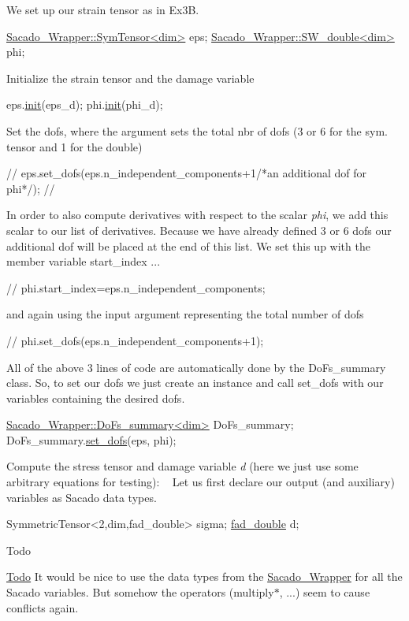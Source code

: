 We set up our strain tensor as in Ex3B. 
\begin{DoxyCode}
\hyperlink{classSacado__Wrapper_1_1SymTensor}{Sacado\_Wrapper::SymTensor<dim>} eps;
\hyperlink{classSacado__Wrapper_1_1SW__double}{Sacado\_Wrapper::SW\_double<dim>} phi;
\end{DoxyCode}
 Initialize the strain tensor and the damage variable 
\begin{DoxyCode}
eps.\hyperlink{classSacado__Wrapper_1_1SymTensor_acbad579d5ead9e96ff46aa15d9b5aef4}{init}(eps\_d);
phi.\hyperlink{classSacado__Wrapper_1_1SW__double_adca799dd92dadebda9aebc91c797682a}{init}(phi\_d);
\end{DoxyCode}
 Set the dofs, where the argument sets the total nbr of dofs (3 or 6 for the sym. tensor and 1 for the double) 
\begin{DoxyCode}
\textcolor{comment}{//    eps.set\_dofs(eps.n\_independent\_components+1/*an additional dof for phi*/);}
\textcolor{comment}{//}
\end{DoxyCode}
 In order to also compute derivatives with respect to the scalar {\itshape phi}, we add this scalar to our list of derivatives. Because we have already defined 3 or 6 dofs our additional dof will be placed at the end of this list. We set this up with the member variable start\+\_\+index ... 
\begin{DoxyCode}
\textcolor{comment}{//    phi.start\_index=eps.n\_independent\_components;}
\end{DoxyCode}
 and again using the input argument representing the total number of dofs 
\begin{DoxyCode}
\textcolor{comment}{//    phi.set\_dofs(eps.n\_independent\_components+1);}
\end{DoxyCode}
 All of the above 3 lines of code are automatically done by the Do\+Fs\+\_\+summary class. So, to set our dofs we just create an instance and call set\+\_\+dofs with our variables containing the desired dofs. 
\begin{DoxyCode}
\hyperlink{classSacado__Wrapper_1_1DoFs__summary}{Sacado\_Wrapper::DoFs\_summary<dim>} DoFs\_summary;
DoFs\_summary.\hyperlink{classSacado__Wrapper_1_1DoFs__summary_a556293f6e683cb30151d9faadc2cc90d}{set\_dofs}(eps, phi);
\end{DoxyCode}
 Compute the stress tensor and damage variable {\itshape d} (here we just use some arbitrary equations for testing)\+: ~\newline
Let us first declare our output (and auxiliary) variables as Sacado data types. 
\begin{DoxyCode}
SymmetricTensor<2,dim,fad\_double> sigma;
\hyperlink{Sacado-auxiliary__functions_8h_a868b94676739e612d9c95940e70892a9}{fad\_double} d;
\end{DoxyCode}
 \begin{DoxyRefDesc}{Todo}
\item[\hyperlink{todo__todo000006}{Todo}]It would be nice to use the data types from the \hyperlink{namespaceSacado__Wrapper}{Sacado\+\_\+\+Wrapper} for all the Sacado variables. But somehow the operators (multiply$\ast$, ...) seem to cause conflicts again.\end{DoxyRefDesc}


